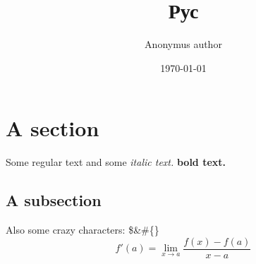 \documentclass{article}%
\title{Рус}%
\author{Anonymus author}%
\date{\today}%
\begin{document}
%
\normalsize%
\maketitle%
\section{A section}%
\label{sec:Asection}%
Some regular text and some %
\textit{italic text. }%
\textbf{bold text. }%
\subsection{A subsection}%
\label{subsec:Asubsection}%
Also some crazy characters: \$\&\#\{\}%
$$f'(a) = \lim_{x \to a} \frac{f(x) - f(a)}{x-a}$$

%
\end{document}
